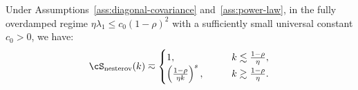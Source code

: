 \documentclass[11pt]{article}
\newcommand{\nesterov}{\mathrm{nesterov}}
\begin{document}
\begin{proposition}
\label{prop:nes_deterministic_bias0}
Under Assumptions~\ref{ass:diagonal-covariance} and~\ref{ass:power-law}, in the fully overdamped regime $\eta\lambda_1\le c_0(1-\rho)^2$ with a sufficiently small universal constant $c_0>0$, we have:
\begin{equation*}
    \cS_{\nesterov}(k)
    \eqsim
    \begin{cases}
    1,&\qquad k\lesssim \frac{1-\rho}{\eta},\\
    \left(\frac{1-\rho}{\eta k}\right)^s, &\qquad k\gtrsim\frac{1-\rho}{\eta}.\\
    \end{cases}
\end{equation*}
\end{proposition}
\end{document}
